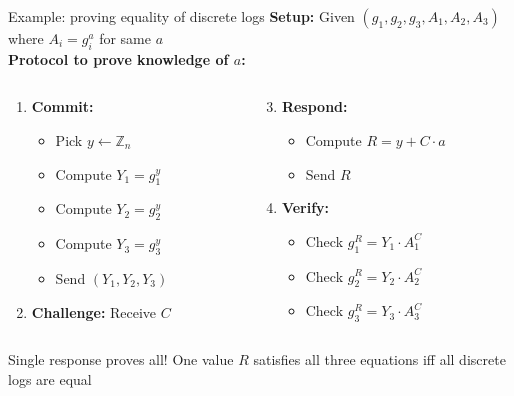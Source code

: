 \documentclass[aspectratio=169, lualatex, handout]{beamer}
\begin{document}
\begin{frame}{Example: proving equality of discrete logs}
	\textbf{Setup:} Given $(g_1, g_2, g_3, A_1, A_2, A_3)$ where $A_i = g_i^a$ for same $a$\\
	\textbf{Protocol to prove knowledge of $a$:}
	\begin{columns}[c]
		\begin{column}{0.5\textwidth}
			\begin{enumerate}
				\item \textbf{Commit:}
				      \begin{itemize}
					      \item Pick $y \leftarrow \mathbb{Z}_n$
					      \item Compute $Y_1 = g_1^y$
					      \item Compute $Y_2 = g_2^y$
					      \item Compute $Y_3 = g_3^y$
					      \item Send $(Y_1, Y_2, Y_3)$
				      \end{itemize}
				\item \textbf{Challenge:} Receive $C$
			\end{enumerate}
		\end{column}
		\begin{column}{0.5\textwidth}
			\begin{enumerate}
				\setcounter{enumi}{2}
				\item \textbf{Respond:}
				      \begin{itemize}
					      \item Compute $R = y + C \cdot a$
					      \item Send $R$
				      \end{itemize}
				\item \textbf{Verify:}
				      \begin{itemize}
					      \item Check $g_1^R = Y_1 \cdot A_1^C$
					      \item Check $g_2^R = Y_2 \cdot A_2^C$
					      \item Check $g_3^R = Y_3 \cdot A_3^C$
				      \end{itemize}
			\end{enumerate}
		\end{column}
	\end{columns}
	\vspace{0.5em}
	\begin{alertblock}{Single response proves all!}
		One value $R$ satisfies all three equations iff all discrete logs are equal
	\end{alertblock}
\end{frame}
\end{document}
